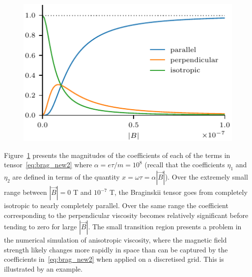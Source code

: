 \begin{figure}[t]
  \centering
  \includegraphics[width=0.5\linewidth]{brag_coeffs_2.pdf}
  \label{fig:brag_coeffs2}
\end{figure}

Figure~\ref{fig:brag_coeffs2} presents the magnitudes of the coefficients of each of the terms in tensor~\eqref{eq:brag_new2} where $\alpha = e\tau/m = 10^{8}$ (recall that the coefficients $\eta_1$ and $\eta_2$ are defined in terms of the quantity $x = \omega \tau =\alpha |\vec{B}|$). Over the extremely small range between $|\vec{B}| = 0$ T and $10^{-7}$ T, the Braginskii tensor goes from completely isotropic to nearly completely parallel. Over the same range the coefficient corresponding to the perpendicular viscosity becomes relatively significant before tending to zero for large $|\vec{B}|$. The small transition region presents a problem in the numerical simulation of anisotropic viscosity, where the magnetic field strength likely changes more rapidly in space than can be captured by the coefficients in~\eqref{eq:brag_new2} when applied on a discretised grid. This is illustrated by an example.

